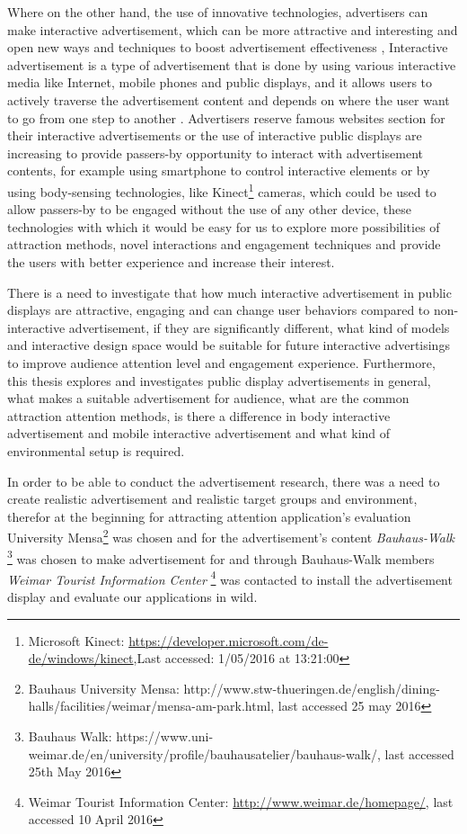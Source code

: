 Where on the other hand, the use of innovative technologies, advertisers can make interactive advertisement, which can be more attractive and interesting and open new ways and techniques to boost advertisement effectiveness \cite{add_effectivenss}, Interactive advertisement is a type of advertisement that is done by using various interactive media like Internet, mobile phones and public displays, and it allows users to actively traverse the advertisement content and depends on where the user want to go from one step to another \cite{Non_inter_vs_interAd}. Advertisers reserve famous websites section for their interactive advertisements or the use of interactive public displays are increasing to provide passers-by opportunity to interact with advertisement contents, for example using smartphone to control interactive elements or by using body-sensing technologies, like Kinect\footnote{Microsoft Kinect: \url{https://developer.microsoft.com/de-de/windows/kinect},Last accessed: 1/05/2016 at 13:21:00} cameras, which could be used to allow passers-by to be engaged without the use of any other device, these technologies with which it would be easy for us to explore more possibilities of attraction methods, novel interactions and engagement techniques and provide the users with better experience and increase their interest. 

There is a need to investigate that how much interactive advertisement in public displays are attractive, engaging and can change user behaviors compared to non-interactive advertisement, if they are significantly different, what kind of models and interactive design space would be suitable for future interactive advertisings to improve audience attention level and engagement experience. Furthermore, this thesis explores and investigates public display advertisements in general, what makes a suitable advertisement for audience, what are the common attraction attention methods, is there a difference in body interactive advertisement and mobile interactive advertisement and what kind of environmental setup is required.

In order to be able to conduct the advertisement research, there was a need to create realistic advertisement and realistic target groups and environment, therefor at the beginning for attracting attention application’s evaluation University Mensa\footnote{Bauhaus University Mensa: http://www.stw-thueringen.de/english/dining-halls/facilities/weimar/mensa-am-park.html, last accessed 25 may 2016} was chosen and for the advertisement’s content \emph{Bauhaus-Walk} \footnote{Bauhaus Walk: https://www.uni-weimar.de/en/university/profile/bauhausatelier/bauhaus-walk/, last accessed 25th May 2016} was chosen to make advertisement for and through Bauhaus-Walk members \emph{Weimar Tourist Information Center} \footnote{Weimar Tourist Information Center: \url{http://www.weimar.de/homepage/}, last accessed 10 April 2016} was contacted to install the advertisement display and evaluate our applications in wild.

